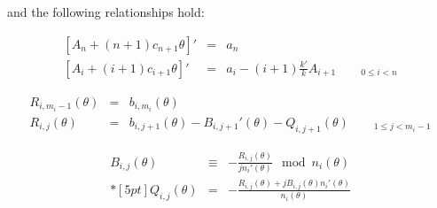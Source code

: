 and the following relationships hold:

\begin{subequations}
\begin{eqnarray}
\label{eq: logarithmic An}
\left[ A_n + (n+1) c_{n+1} \theta \right]' &=& a_n \\
\label{eq: logarithmic Ai's}
\left[ A_i + (i+1) c_{i+1} \theta \right]' &=& a_i - (i+1) \frac{k'}{k} A_{i+1} \qquad {}_{0\le i<n}
\end{eqnarray}
\end{subequations}

\begin{comment}
\begin{IEEEeqnarray*}{rClc}
R_{i,m_i-1}(\theta) &=& b_{i,m_i}(\theta) & \IEEEyessubnumber \\*[10pt]
R_{i,j}(\theta) &=& b_{i,j+1}(\theta) - B_{i,j+1}'(\theta) - Q_{i,j+1}(\theta) \qquad{}_{1\le j<m_i-1}&  \IEEEyessubnumber \\
B_{i,j}(\theta) &\equiv& - \frac{R_{i,j}(\theta)}{j n_i'(\theta) } \mod n_i(\theta) &  \IEEEyesnumber \\*[10pt]
Q_{i,j}(\theta) &=& - \frac{R_{i,j}(\theta) + j B_{i,j}(\theta) n_i'(\theta)}{n_i(\theta)} &  \IEEEyesnumber
\end{IEEEeqnarray*}
\end{comment}

\begin{subequations}
\begin{eqnarray}
R_{i,m_i-1}(\theta) &=& b_{i,m_i}(\theta) \\
R_{i,j}(\theta) &=& b_{i,j+1}(\theta) - B_{i,j+1}'(\theta) - Q_{i,j+1}(\theta) \qquad{}_{1\le j<m_i-1}
\end{eqnarray}
\end{subequations}

\begin{eqnarray}
B_{i,j}(\theta) &\equiv& - \frac{R_{i,j}(\theta)}{j n_i'(\theta) } \mod n_i(\theta)  \\*[5pt]
Q_{i,j}(\theta) &=& - \frac{R_{i,j}(\theta) + j B_{i,j}(\theta) n_i'(\theta)}{n_i(\theta)}
\end{eqnarray}

\begin{comment}
\begin{IEEEeqnarray*}{rCl?c}
\IEEEeqnarraymulticol{3}{c}{m_i > 1} & m_i = 1 \\*[10pt]
C_i &=& \frac{b_{i,1}(\theta) - B_{i,1}'(\theta) - Q_{i,1}(\theta)}{n_i'(\theta)} & C_i = \frac{b_{i,1}(\theta)}{n_i'(\theta)} \IEEEyesnumber
\end{IEEEeqnarray*}
\end{comment}

